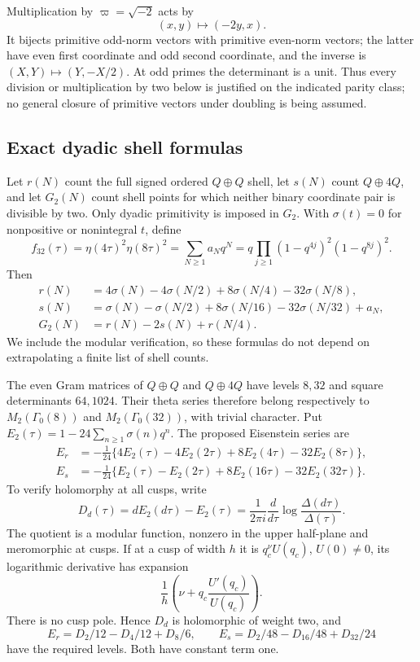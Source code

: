 Multiplication by \(\varpi=\sqrt{-2}\) acts by
\[
                   (x,y)\longmapsto(-2y,x).
\]
It bijects primitive odd-norm vectors with primitive even-norm
vectors; the latter have even first coordinate and odd second
coordinate, and the inverse is \((X,Y)\mapsto(Y,-X/2)\).
At odd primes the determinant is a unit. Thus every division or
multiplication by two below is justified on the indicated parity
class; no general closure of primitive vectors under doubling is
being assumed.

\subsection{Exact dyadic shell formulas}

Let \(r(N)\) count the full signed ordered \(Q\oplus Q\) shell,
let \(s(N)\) count \(Q\oplus4Q\), and let \(G_2(N)\) count shell
points for which neither binary coordinate pair is divisible by
two. Only dyadic primitivity is imposed in \(G_2\).
With \(\sigma(t)=0\) for nonpositive or nonintegral \(t\), define
\[
 f_{32}(\tau)=\eta(4\tau)^2\eta(8\tau)^2
     =\sum_{N\ge1}a_Nq^N
     =q\prod_{j\ge1}(1-q^{4j})^2(1-q^{8j})^2 .
\]
Then
\begin{equation}
\begin{aligned}
 r(N)&=4\sigma(N)-4\sigma(N/2)+8\sigma(N/4)-32\sigma(N/8),\\
 s(N)&=\sigma(N)-\sigma(N/2)+8\sigma(N/16)-32\sigma(N/32)+a_N,\\
 G_2(N)&=r(N)-2s(N)+r(N/4).                                  \end{aligned}\label{eq:m8-theta}
\end{equation}
We include the modular verification, so these formulas do not
depend on extrapolating a finite list of shell counts.

The even Gram matrices of \(Q\oplus Q\) and \(Q\oplus4Q\)
have levels \(8,32\) and square determinants \(64,1024\).
Their theta series therefore belong respectively to
\(M_2(\Gamma_0(8))\) and \(M_2(\Gamma_0(32))\), with trivial
character. Put
\(E_2(\tau)=1-24\sum_{n\ge1}\sigma(n)q^n\).
The proposed Eisenstein series are
\[
\begin{aligned}
 E_r&=-\tfrac1{24}
       \{4E_2(\tau)-4E_2(2\tau)+8E_2(4\tau)-32E_2(8\tau)\},\\
 E_s&=-\tfrac1{24}
       \{E_2(\tau)-E_2(2\tau)+8E_2(16\tau)-32E_2(32\tau)\}.
\end{aligned}
\]
To verify holomorphy at all cusps, write
\[
 D_d(\tau)=dE_2(d\tau)-E_2(\tau)
    =\frac1{2\pi i}\frac d{d\tau}
           \log\frac{\Delta(d\tau)}{\Delta(\tau)} .
\]
The quotient is a modular function, nonzero in the upper
half-plane and meromorphic at cusps. If at a cusp of width \(h\)
it is \(q_c^\nu U(q_c)\), \(U(0)\ne0\), its logarithmic derivative
has expansion
\[
                    \frac1h\left(\nu+
                              q_c\frac{U'(q_c)}{U(q_c)}\right).
\]
There is no cusp pole. Hence \(D_d\) is holomorphic of weight two,
and
\[
 E_r=D_2/12-D_4/12+D_8/6,\qquad
 E_s=D_2/48-D_{16}/48+D_{32}/24
\]
have the required levels. Both have constant term one.

